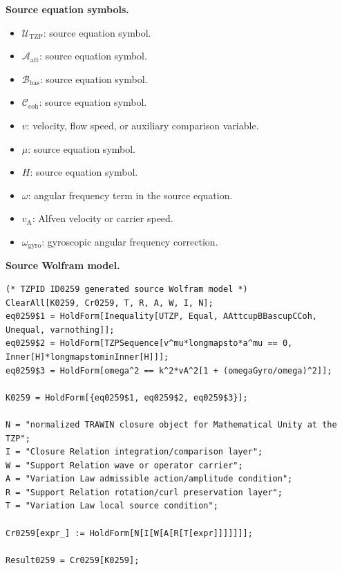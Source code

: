 \begin{minipage}[t]{0.49\linewidth}
\begingroup
\small
\raggedright
\textbf{Source equation symbols.}\par
\begin{itemize}[leftmargin=1.35em,itemsep=1pt,topsep=1pt,parsep=0pt]
    \item $\mathcal{U}_{\mathrm{TZP}}$: source equation symbol.
    \item $\mathcal{A}_{\mathrm{att}}$: source equation symbol.
    \item $\mathcal{B}_{\mathrm{bas}}$: source equation symbol.
    \item $\mathcal{C}_{\mathrm{coh}}$: source equation symbol.
    \item $v$: velocity, flow speed, or auxiliary comparison variable.
    \item $\mu$: source equation symbol.
    \item $H$: source equation symbol.
    \item $\omega$: angular frequency term in the source equation.
    \item $v_{\mathrm{A}}$: Alfven velocity or carrier speed.
    \item $\omega_{\mathrm{gyro}}$: gyroscopic angular frequency correction.
\end{itemize}
\endgroup
\end{minipage}\hfill
\begin{minipage}[t]{0.47\linewidth}
\begingroup
\scriptsize
\raggedright
\textbf{Source Wolfram model.}\par
\begin{Verbatim}[fontsize=\tiny,breaklines=true,breakanywhere=true]
(* TZPID ID0259 generated source Wolfram model *)
ClearAll[K0259, Cr0259, T, R, A, W, I, N];
eq0259$1 = HoldForm[Inequality[UTZP, Equal, AAttcupBBascupCCoh, Unequal, varnothing]];
eq0259$2 = HoldForm[TZPSequence[v^mu*longmapsto*a^mu == 0, Inner[H]*longmapstominInner[H]]];
eq0259$3 = HoldForm[omega^2 == k^2*vA^2[1 + (omegaGyro/omega)^2]];

K0259 = HoldForm[{eq0259$1, eq0259$2, eq0259$3}];

N = "normalized TRAWIN closure object for Mathematical Unity at the TZP";
I = "Closure Relation integration/comparison layer";
W = "Support Relation wave or operator carrier";
A = "Variation Law admissible action/amplitude condition";
R = "Support Relation rotation/curl preservation layer";
T = "Variation Law local source condition";

Cr0259[expr_] := HoldForm[N[I[W[A[R[T[expr]]]]]]];

Result0259 = Cr0259[K0259];
\end{Verbatim}
\endgroup
\end{minipage}

